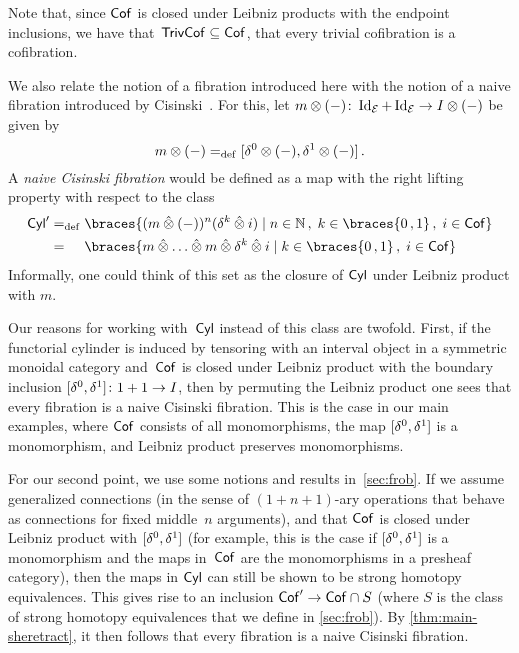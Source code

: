 \documentclass[reqno,10pt,a4paper,oneside,draft]{amsart}
\begin{document}
Note that, since $\mathsf{Cof}$ is closed under Leibniz products with the endpoint inclusions, we have that~$\mathsf{TrivCof} \subseteq \mathsf{Cof}$, \ie that every trivial cofibration is a cofibration.
\begin{remark} \label{cisinski-remark}
We also relate the notion of a fibration introduced here with the notion of a naive fibration introduced by Cisinski~\cite{cisinski-asterisque}.
For this, let $m \otimes (-)  \colon \operatorname{Id}_{\mathcal{E}} + \operatorname{Id}_{\mathcal{E}} \to I \otimes (-)$ be given by
\[
m \otimes (-) =_{\operatorname{def}} [\delta^0 \otimes (-), \delta^1 \otimes (-)]
\, .\]
A \emph{naive Cisinski fibration} would be defined as a map with the right lifting property with respect to the class
\begin{align*}
\Cyl'
&\defeq
\braces{(m \hatotimes (-))^n (\kcyl \hatotimes i) \mid n \in \mathbb{N} \, , \; k \in \braces{0\,,1} \, , \;  i \in \Cof}
\\
&=_{\phantom{\operatorname{def}}}
\braces{m \hatotimes \ldots \hatotimes m \hatotimes \kcyl \hatotimes i \mid k \in \braces{0\,,1} \, , \;  i \in \Cof}
\end{align*}
Informally, one could think of this set as the closure of $\mathsf{Cyl}$ under Leibniz product with $m$.

Our reasons for working with~$\mathsf{Cyl}$ instead of this class are twofold.
First, if the functorial cylinder is induced by tensoring with an interval object in a symmetric monoidal category and~$\mathsf{Cof}$ is closed under Leibniz product with the boundary inclusion $[\delta^0, \delta^1] \colon 1 + 1 \to I$, then by permuting the Leibniz product one sees that every fibration is a naive Cisinski fibration.
This is the case in our main examples, where $\mathsf{Cof}$ consists of all monomorphisms, the map $[\delta^0, \delta^1]$ is a monomorphism, and Leibniz product preserves monomorphisms.

For our second point, we use some notions and results in~\cref{sec:frob}.
If we assume generalized connections (in the sense of $(1+n+1)$-ary operations that behave as connections for fixed middle~$n$ arguments), and that $\mathsf{Cof}$ is closed under Leibniz product with $[\delta^0, \delta^1]$ (for example, this is the case if $[\delta^0, \delta^1]$ is a monomorphism and the maps in~$\mathsf{Cof}$ are the monomorphisms in a presheaf category), then the maps in $\mathsf{Cyl}$ can still be shown to be strong homotopy equivalences.
This gives rise to an inclusion $\mathsf{Cof}' \to \mathsf{Cof} \cap S$ (where $S$ is the class of strong homotopy equivalences that we define in \cref{sec:frob}).
By \cref{thm:main-sheretract}, it then follows that every fibration is a naive Cisinski fibration.
\end{remark}
\end{document}
